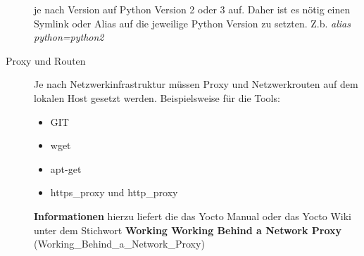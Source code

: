 \begin{description}
        je nach Version auf Python Version 2 oder 3 auf. Daher ist es nötig einen
        Symlink  oder Alias auf die jeweilige Python Version zu setzten.
        Z.b. \textit{alias python=python2}
    \item[Proxy und Routen]
    Je nach Netzwerkinfrastruktur müssen Proxy und Netzwerkrouten auf
    dem lokalen Host gesetzt werden. Beispielsweise für die Tools:
        \begin{itemize}
            \item GIT
            \item wget
            \item apt-get
            \item https\_proxy und http\_proxy
        \end{itemize}
        \textbf{Informationen} hierzu liefert die das Yocto Manual oder das
            Yocto Wiki unter dem Stichwort \glqq \textbf{Working Working Behind
            a Network Proxy} \grqq (Working\_Behind\_a\_Network\_Proxy)

\end{description}

